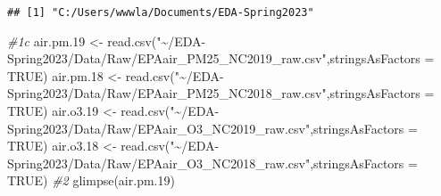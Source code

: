 \documentclass[
]{article}
\newenvironment{Shaded}{\begin{snugshade}}{\end{snugshade}}
\newcommand{\AttributeTok}[1]{\textcolor[rgb]{0.77,0.63,0.00}{#1}}
\newcommand{\CommentTok}[1]{\textcolor[rgb]{0.56,0.35,0.01}{\textit{#1}}}
\newcommand{\ConstantTok}[1]{\textcolor[rgb]{0.00,0.00,0.00}{#1}}
\newcommand{\FloatTok}[1]{\textcolor[rgb]{0.00,0.00,0.81}{#1}}
\newcommand{\FunctionTok}[1]{\textcolor[rgb]{0.00,0.00,0.00}{#1}}
\newcommand{\NormalTok}[1]{#1}
\newcommand{\OtherTok}[1]{\textcolor[rgb]{0.56,0.35,0.01}{#1}}
\newcommand{\StringTok}[1]{\textcolor[rgb]{0.31,0.60,0.02}{#1}}
\begin{document}
\begin{verbatim}
## [1] "C:/Users/wwwla/Documents/EDA-Spring2023"
\end{verbatim}

\begin{Shaded}
\begin{Highlighting}[]
\CommentTok{\#1c }
\NormalTok{air.pm}\FloatTok{.19} \OtherTok{\textless{}{-}} \FunctionTok{read.csv}\NormalTok{(}\StringTok{"\textasciitilde{}/EDA{-}Spring2023/Data/Raw/EPAair\_PM25\_NC2019\_raw.csv"}\NormalTok{,}\AttributeTok{stringsAsFactors =} \ConstantTok{TRUE}\NormalTok{)}
\NormalTok{air.pm}\FloatTok{.18} \OtherTok{\textless{}{-}} \FunctionTok{read.csv}\NormalTok{(}\StringTok{"\textasciitilde{}/EDA{-}Spring2023/Data/Raw/EPAair\_PM25\_NC2018\_raw.csv"}\NormalTok{,}\AttributeTok{stringsAsFactors =} \ConstantTok{TRUE}\NormalTok{)}
\NormalTok{air.o3}\FloatTok{.19} \OtherTok{\textless{}{-}} \FunctionTok{read.csv}\NormalTok{(}\StringTok{"\textasciitilde{}/EDA{-}Spring2023/Data/Raw/EPAair\_O3\_NC2019\_raw.csv"}\NormalTok{,}\AttributeTok{stringsAsFactors =} \ConstantTok{TRUE}\NormalTok{)}
\NormalTok{air.o3}\FloatTok{.18} \OtherTok{\textless{}{-}} \FunctionTok{read.csv}\NormalTok{(}\StringTok{"\textasciitilde{}/EDA{-}Spring2023/Data/Raw/EPAair\_O3\_NC2018\_raw.csv"}\NormalTok{,}\AttributeTok{stringsAsFactors =} \ConstantTok{TRUE}\NormalTok{)}
\CommentTok{\#2 }
\FunctionTok{glimpse}\NormalTok{(air.pm}\FloatTok{.19}\NormalTok{)}
\end{Highlighting}
\end{Shaded}
\end{document}

